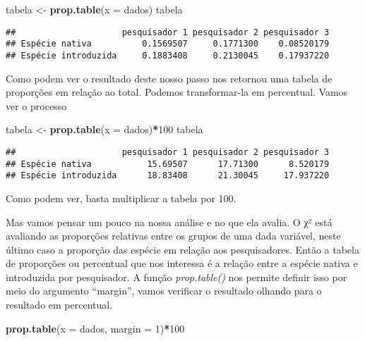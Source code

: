 \documentclass[]{book}
\newenvironment{Shaded}{\begin{snugshade}}{\end{snugshade}}
\newcommand{\DataTypeTok}[1]{\textcolor[rgb]{0.13,0.29,0.53}{#1}}
\newcommand{\DecValTok}[1]{\textcolor[rgb]{0.00,0.00,0.81}{#1}}
\newcommand{\KeywordTok}[1]{\textcolor[rgb]{0.13,0.29,0.53}{\textbf{#1}}}
\newcommand{\NormalTok}[1]{#1}
\newcommand{\OperatorTok}[1]{\textcolor[rgb]{0.81,0.36,0.00}{\textbf{#1}}}
\newcommand{\StringTok}[1]{\textcolor[rgb]{0.31,0.60,0.02}{#1}}
\begin{document}
\begin{Shaded}
\begin{Highlighting}[]
\NormalTok{tabela <-}\StringTok{ }\KeywordTok{prop.table}\NormalTok{(}\DataTypeTok{x =}\NormalTok{ dados)}
\NormalTok{tabela}
\end{Highlighting}
\end{Shaded}

\begin{verbatim}
##                     pesquisador 1 pesquisador 2 pesquisador 3
## Espécie nativa          0.1569507     0.1771300    0.08520179
## Espécie introduzida     0.1883408     0.2130045    0.17937220
\end{verbatim}

Como podem ver o resultado deste nosso passo nos retornou uma tabela de proporções em relação ao total. Podemos transformar-la em percentual. Vamos ver o processo

\begin{Shaded}
\begin{Highlighting}[]
\NormalTok{tabela <-}\StringTok{ }\KeywordTok{prop.table}\NormalTok{(}\DataTypeTok{x =}\NormalTok{ dados)}\OperatorTok{*}\DecValTok{100}
\NormalTok{tabela}
\end{Highlighting}
\end{Shaded}

\begin{verbatim}
##                     pesquisador 1 pesquisador 2 pesquisador 3
## Espécie nativa           15.69507      17.71300      8.520179
## Espécie introduzida      18.83408      21.30045     17.937220
\end{verbatim}

Como podem ver, basta multiplicar a tabela por 100.

Mas vamos pensar um pouco na nossa análise e no que ela avalia. O χ² está avaliando as proporções relativas entre os grupos de uma dada variável, neste último caso a proporção das espécie em relação aos pesquisadores. Então a tabela de proporções ou percentual que nos interessa é a relação entre a espécie nativa e introduzida por pesquisador. A função \emph{prop.table()} nos permite definir isso por meio do argumento ``margin'', vamos verificar o resultado olhando para o resultado em percentual.

\begin{Shaded}
\begin{Highlighting}[]
\KeywordTok{prop.table}\NormalTok{(}\DataTypeTok{x =}\NormalTok{ dados, }\DataTypeTok{margin =} \DecValTok{1}\NormalTok{)}\OperatorTok{*}\DecValTok{100}
\end{Highlighting}
\end{Shaded}
\end{document}
